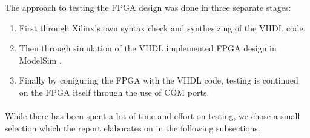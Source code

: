 The approach to testing the FPGA design was done in three separate stages:
\begin{enumerate}
	\item First through Xilinx's \cite{xilinx-ise} own syntax check and
synthesizing of the VHDL code.
	\item Then through simulation of the VHDL implemented FPGA design in
ModelSim \cite{modelsim}.
	\item Finally by coniguring the FPGA with the VHDL code, testing is
continued on the FPGA itself through the use of COM ports.
\end{enumerate}
\paragraph*{}
While there has been spent a lot of time and effort on testing, we chose a small
selection which the report elaborates on in the following subsections.\newpage
